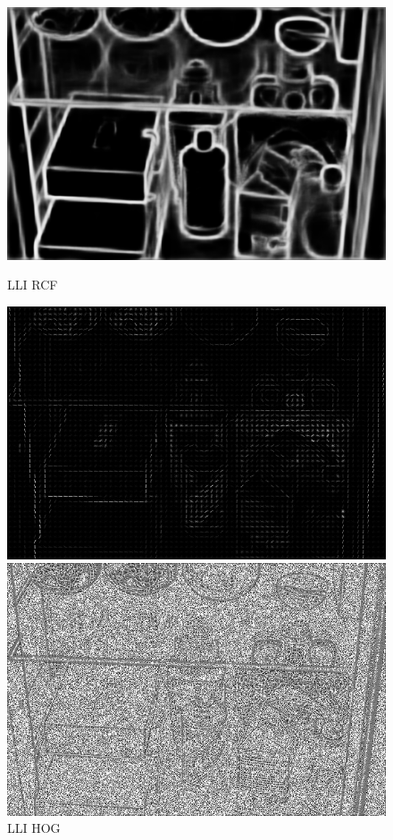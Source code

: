 \documentclass[CJK,aspectratio=169]{beamer}  %
\begin{document}
\begin{frame}
\begin{figure}
\begin{minipage}{.19\textwidth}
				\includegraphics[width=\linewidth]{picture/LLIE/My Architecture/Edge Detection/low00044_rcf}
				\caption*{\tiny LLI RCF}
				\label{fig: LLI_rcf}	
			\end{minipage}
			\begin{minipage}{.19\textwidth}
				\centering
				\includegraphics[width=\linewidth]{picture/LLIE/My Architecture/Edge Detection/low00044_hog}
				\caption*{\tiny LLI HOG}
				\label{fig: LLI_hog}	
			\end{minipage}
			\begin{minipage}{.19\textwidth}
				\centering
				\includegraphics[width=\linewidth]{picture/LLIE/My Architecture/Edge Detection/low00044_lbp}

\end{minipage}
\end{figure}
\end{frame}
\end{document}
